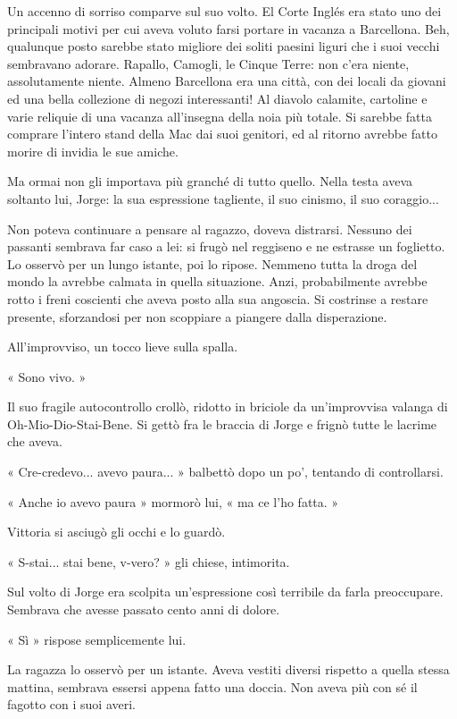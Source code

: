 Un accenno di sorriso comparve sul suo volto. El Corte Inglés era stato uno dei principali motivi per cui aveva voluto farsi portare in vacanza a Barcellona. Beh, qualunque posto sarebbe stato migliore dei soliti paesini liguri che i suoi vecchi sembravano adorare. Rapallo, Camogli, le Cinque Terre: non c'era niente, assolutamente niente. Almeno Barcellona era una città, con dei locali da giovani ed una bella collezione di negozi interessanti! Al diavolo calamite, cartoline e varie reliquie di una vacanza all'insegna della noia più totale. Si sarebbe fatta comprare l'intero stand della Mac dai suoi genitori, ed al ritorno avrebbe fatto morire di invidia le sue amiche.

Ma ormai non gli importava più granché di tutto quello. Nella testa aveva soltanto lui, Jorge: la sua espressione tagliente, il suo cinismo, il suo coraggio...

Non poteva continuare a pensare al ragazzo, doveva distrarsi. Nessuno dei passanti sembrava far caso a lei: si frugò nel reggiseno e ne estrasse un foglietto. Lo osservò per un lungo istante, poi lo ripose. Nemmeno tutta la droga del mondo la avrebbe calmata in quella situazione. Anzi, probabilmente avrebbe rotto i freni coscienti che aveva posto alla sua angoscia. Si costrinse a restare presente, sforzandosi per non scoppiare a piangere dalla disperazione.

All'improvviso, un tocco lieve sulla spalla.

« Sono vivo. »

Il suo fragile autocontrollo crollò, ridotto in briciole da un'improvvisa valanga di Oh-Mio-Dio-Stai-Bene. Si gettò fra le braccia di Jorge e frignò tutte le lacrime che aveva.

« Cre-credevo... avevo paura... » balbettò dopo un po', tentando di controllarsi.

« Anche io avevo paura » mormorò lui, « ma ce l'ho fatta. »

Vittoria si asciugò gli occhi e lo guardò.

« S-stai... stai bene, v-vero? » gli chiese, intimorita.

Sul volto di Jorge era scolpita un'espressione così terribile da farla preoccupare. Sembrava che avesse passato cento anni di dolore.

« Sì » rispose semplicemente lui.

La ragazza lo osservò per un istante. Aveva vestiti diversi rispetto a quella stessa mattina, sembrava essersi appena fatto una doccia. Non aveva più con sé il fagotto con i suoi averi.

